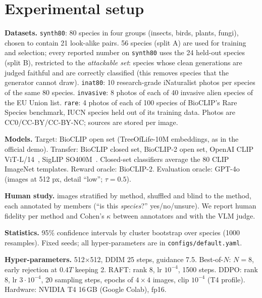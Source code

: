 \section{Experimental setup}\label{sec:setup}
\textbf{Datasets.}
\texttt{synth80}: 80 species in four groups (insects, birds, plants, fungi), chosen to contain 21 look-alike pairs.
56 species (split A) are used for training and selection; every reported number on \texttt{synth80} uses the 24
held-out species (split B), restricted to the \emph{attackable set}: species whose clean generations are judged
faithful and are correctly classified (this removes species that the generator cannot draw).
\texttt{inat80}: 10 research-grade iNaturalist photos per species of the same 80 species.
\texttt{invasive}: 8 photos of each of 40 invasive alien species of the EU Union list.
\texttt{rare}: 4 photos of each of 100 species of BioCLIP's Rare Species benchmark, IUCN species held out of its
training data. Photos are CC0/CC-BY/CC-BY-NC; sources are stored per image.

\textbf{Models.} Target: BioCLIP open set (TreeOfLife-10M embeddings, as in the official demo). Transfer: BioCLIP
closed set, BioCLIP-2 open set, OpenAI CLIP ViT-L/14~\citep{radford2021clip}, SigLIP SO400M~\citep{zhai2023siglip}.
Closed-set classifiers average the 80 CLIP ImageNet templates. Reward oracle: BioCLIP-2. Evaluation oracle:
GPT-4o (images at 512 px, detail ``low''; $\tau=0.5$).

\textbf{Human study.}  images stratified by method, shuffled and blind to the method, each annotated by
 members (``is this \emph{species}?'' yes/no/unsure). We report human fidelity per method and Cohen's
$\kappa$ between annotators and with the VLM judge.

\textbf{Statistics.} 95\% confidence intervals by cluster bootstrap over species (1000 resamples). Fixed seeds; all
hyper-parameters are in \texttt{configs/default.yaml}.

\textbf{Hyper-parameters.} 512$\times$512, DDIM 25 steps, guidance 7.5. Best-of-$N$: $N{=}8$, early rejection at
$0.4T$ keeping 2. RAFT: rank 8, lr $10^{-4}$, 1500 steps. DDPO: rank 8, lr $3\cdot10^{-4}$, 20 sampling steps,
 epochs of $4\times4$ images, clip $10^{-4}$ (T4 profile). Hardware: NVIDIA T4 16\,GB (Google Colab), fp16.
